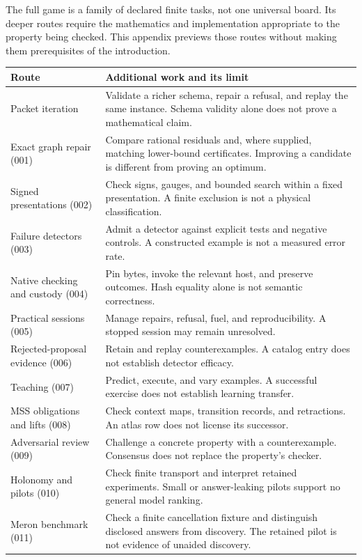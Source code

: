 \documentclass[
  11pt,
]{article}
\begin{document}
The full game is a family of declared finite tasks, not one universal
board. Its deeper routes require the mathematics and implementation
appropriate to the property being checked. This appendix previews those
routes without making them prerequisites of the introduction.

\begin{longtable}[]{@{}
  >{\raggedright\arraybackslash}p{}
  >{\raggedright\arraybackslash}p{}@{}}
\toprule\noalign{}
\begin{minipage}[b]{\linewidth}\raggedright
Route
\end{minipage} & \begin{minipage}[b]{\linewidth}\raggedright
Additional work and its limit
\end{minipage} \\
\midrule\noalign{}
\endhead
\bottomrule\noalign{}
\endlastfoot
Packet iteration & Validate a richer schema, repair a refusal, and
replay the same instance. Schema validity alone does not prove a
mathematical claim. \\
Exact graph repair (001) & Compare rational residuals and, where
supplied, matching lower-bound certificates. Improving a candidate is
different from proving an optimum. \\
Signed presentations (002) & Check signs, gauges, and bounded search
within a fixed presentation. A finite exclusion is not a physical
classification. \\
Failure detectors (003) & Admit a detector against explicit tests and
negative controls. A constructed example is not a measured error
rate. \\
Native checking and custody (004) & Pin bytes, invoke the relevant host,
and preserve outcomes. Hash equality alone is not semantic
correctness. \\
Practical sessions (005) & Manage repairs, refusal, fuel, and
reproducibility. A stopped session may remain unresolved. \\
Rejected-proposal evidence (006) & Retain and replay counterexamples. A
catalog entry does not establish detector efficacy. \\
Teaching (007) & Predict, execute, and vary examples. A successful
exercise does not establish learning transfer. \\
MSS obligations and lifts (008) & Check context maps, transition
records, and retractions. An atlas row does not license its
successor. \\
Adversarial review (009) & Challenge a concrete property with a
counterexample. Consensus does not replace the property's checker. \\
Holonomy and pilots (010) & Check finite transport and interpret
retained experiments. Small or answer-leaking pilots support no general
model ranking. \\
Meron benchmark (011) & Check a finite cancellation fixture and
distinguish disclosed answers from discovery. The retained pilot is not
evidence of unaided discovery. \\
\end{longtable}
\end{document}
